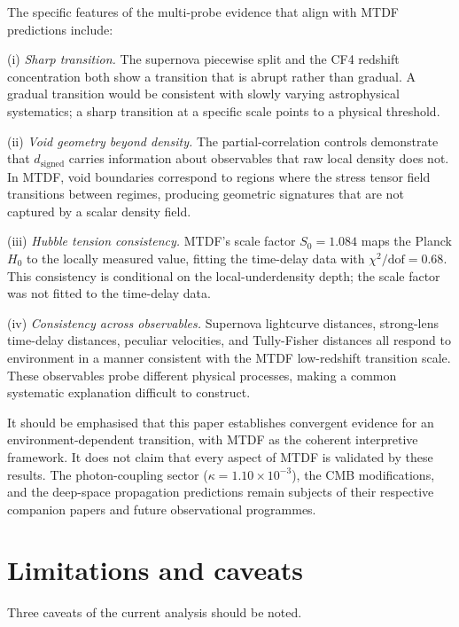 \documentclass[11pt,a4paper]{article}
\begin{document}
The specific features of the multi-probe evidence that align with MTDF predictions include:

(i) \emph{Sharp transition.} The supernova piecewise split and the CF4 redshift concentration both show a transition that is abrupt rather than gradual. A gradual transition would be consistent with slowly varying astrophysical systematics; a sharp transition at a specific scale points to a physical threshold.

(ii) \emph{Void geometry beyond density.} The partial-correlation controls demonstrate that \(d_\mathrm{signed}\) carries information about observables that raw local density does not. In MTDF, void boundaries correspond to regions where the stress tensor field transitions between regimes, producing geometric signatures that are not captured by a scalar density field.

(iii) \emph{Hubble tension consistency.} MTDF's scale factor \(S_0 = 1.084\) maps the Planck \(H_0\) to the locally measured value, fitting the time-delay data with \(\chi^2/\mathrm{dof} = 0.68\). This consistency is conditional on the local-underdensity depth; the scale factor was not fitted to the time-delay data.

(iv) \emph{Consistency across observables.} Supernova lightcurve distances, strong-lens time-delay distances, peculiar velocities, and Tully-Fisher distances all respond to environment in a manner consistent with the MTDF low-redshift transition scale. These observables probe different physical processes, making a common systematic explanation difficult to construct.

It should be emphasised that this paper establishes convergent evidence for an environment-dependent transition, with MTDF as the coherent interpretive framework. It does not claim that every aspect of MTDF is validated by these results. The photon-coupling sector (\(\kappa = 1.10 \times 10^{-3}\)), the CMB modifications, and the deep-space propagation predictions remain subjects of their respective companion papers and future observational programmes.

\section{Limitations and caveats}
\label{sec:sec9}
Three caveats of the current analysis should be noted.
\end{document}
